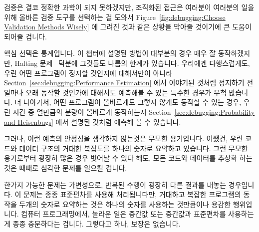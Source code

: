 검증은 결코 정확한 과학이 되지 못하겠지만, 조직화된 접근은 여러분이 여러분의
일을 위해 올바른 검증 도구를 선택하는 걸 도와서
Figure~\ref{fig:debugging:Choose Validation Methods Wisely}
에 그려진 것과 같은 상황을 막아줄 것이기에 큰 도움이 되어줄 겁니다.

핵심 선택은 통계입니다.
이 챕터에 설명된 방법이 대부분의 경우 매우 잘 동작하겠지만, Halting
문제~\cite{AlanMTuring1937HaltingProblem,GeoffreyKPullum2000HaltingProblem}
덕분에 그것들도 나름의 한계가 있습니다.
우리에겐 다행스럽게도, 우린 어떤 프로그램이 정지할 것인지에 대해서만이 아니라
Section~\ref{sec:debugging:Performance Estimation} 에서 이야기된 것처럼
정지하기 전 얼마나 오래 동작할 것인가에 대해서도 예측해볼 수 있는 특수한 경우가
무척 많습니다.
더 나아가서, 어떤 프로그램이 올바르게도 그렇지 않게도 동작할 수 있는 경우, 우린
시간 중 얼만큼의 분량이 올바르게 동작하는지
Section~\ref{sec:debugging:Probability and Heisenbugs} 에서 설명된 것처럼
예측해 볼 수 있습니다.

그러나, 이런 예측의 안정성을 생각하지 않는것은 무모한 용기입니다.
어쨌건, 우린 코드와 데이터 구조의 거대한 복잡도를 하나의 숫자로 요약하고
있습니다.
그런 무모한 용기로부터 굉장히 많은 경우 벗어날 수 있다 해도, 모든 코드와
데이터를 추상화 하는 것은 때때로 심각한 문제를 일으킬 겁니다.

한가지 가능한 문제는 가변성으로, 반복된 수행이 굉장히 다른 결과를 내놓는
경우입니다.
이 문제는 종종 표준편차를 사용해 처리됩니다만, 거대하고 복잡한 프로그램의
동작을 두개의 숫자로 요약하는 것은 하나의 숫자를 사용하는 것만큼이나 용감한
행위입니다.
컴퓨터 프로그래밍에서, 놀라운 일은 중간값 또는 중간값과 표준편차를 사용하는게
종종 충분하다는 겁니다.
그렇다고 하나, 보장은 없습니다.

